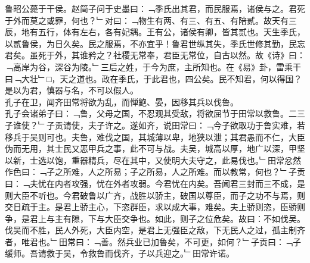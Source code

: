 {鲁昭公薨于干侯。赵简子问于史墨曰：﹁季氏出其君，而民服焉，诸侯与之。君死于外而莫之或罪，何也？﹂对曰：﹁物生有两、有三、有五、有陪贰。故天有三辰，地有五行，体有左右，各有妃耦。王有公，诸侯有卿，皆其贰也。天生季氏，以贰鲁侯，为日久矣。民之服焉，不亦宜乎！鲁君世纵其失，季氏世修其勤，民忘君矣。虽死于外，其谁矜之？社稷无常奉，君臣无常位，自古以然。故《诗》曰：﹁高岸为谷，深谷为陵。﹂三后之姓，于今为庶，主所知也。在《易》卦，雷乘干曰﹁大壮﹂□，天之道也。政在季氏，于此君也，四公矣。民不知君，何以得国？是以为君，慎器与名，不可以假人。
\\
孔子在卫，闻齐田常将欲为乱，而惮鲍、晏，因移其兵以伐鲁。\\
孔子会诸弟子曰：﹁鲁，父母之国，不忍观其受敌，将欲屈节于田常以救鲁。二三子谁使？﹂子贡请使，夫子许之。遂如齐，说田常曰：﹁今子欲取功于鲁实难，若移兵于吴则可也。夫鲁，难伐之国，其城薄以卑，地狭以泄；其君愚而不仁，大臣伪而无用，其士民又恶甲兵之事，此不可与战。夫吴，城高以厚，地广以深，甲坚以新，士选以饱，重器精兵，尽在其中，又使明大夫守之，此易伐也。﹂田常忿然作色曰：﹁子之所难，人之所易；子之所易，人之所难。而以教常，何也？﹂子贡曰：﹁夫忧在内者攻强，忧在外者攻弱。今君忧在内矣。吾闻君三封而三不成，是则大臣不听也。今君破鲁以广齐，战胜以骄主，破国以尊臣，而子之功不与焉，则交日疏于主。是君上骄主心，下恣群臣，求以成大事，难矣。夫上骄则恣，臣骄则争，是君上与主有隙，下与大臣交争也。如此，则子之位危矣。故曰：不如伐吴。伐吴而不胜，民人外死，大臣内空，是君上无强臣之敌，下无民人之过，孤主制齐者，唯君也。﹂田常曰：﹁善。然兵业已加鲁矣，不可更，如何？﹂子贡曰：﹁子缓师。吾请救于吴，令救鲁而伐齐，子以兵迎之。﹂田常许诺。
}
